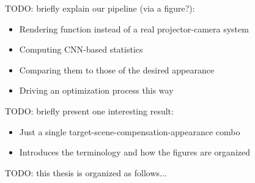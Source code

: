 {\color{red} TODO: briefly explain our pipeline (via a figure?):
    \begin{itemize}
        \item Rendering function instead of a real projector-camera system
        \item Computing CNN-based statistics
        \item Comparing them to those of the desired appearance
        \item Driving an optimization process this way
    \end{itemize}
}

{\color{red} TODO: briefly present one interesting result:
    \begin{itemize}
        \item Just a single target-scene-compensation-appearance combo
        \item Introduces the terminology and how the figures are organized
    \end{itemize}
}

{\color{red} TODO: this thesis is organized as follows...}
